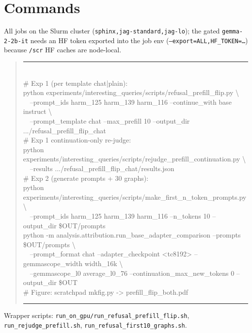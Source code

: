 \documentclass[11pt]{article}
\newenvironment{cbox}{\begin{quote}\small\begin{minipage}{0.95\linewidth}\rule{\linewidth}{0.4pt}\\}{\\\rule{\linewidth}{0.4pt}\end{minipage}\end{quote}}
\newcommand{\code}[1]{\texttt{\small #1}}
\begin{document}
\section{Commands}\label{app:commands}
All jobs on the Slurm cluster (\code{sphinx,jag-standard,jag-lo}); the gated \code{gemma-2-2b-it} needs an HF token exported into the job env (\code{--export=ALL,HF\_TOKEN=\ldots}) because \code{/scr} HF caches are node-local.
\begin{cbox}\scriptsize\ttfamily
\# Exp 1 (per template chat|plain):\\
python experiments/interesting\_queries/scripts/refusal\_prefill\_flip.py \textbackslash\\
\ \ --prompt\_ids harm\_125 harm\_139 harm\_116 --continue\_with base instruct \textbackslash\\
\ \ --prompt\_template chat --max\_prefill 10 --output\_dir .../refusal\_prefill\_flip\_chat\\[4pt]
\# Exp 1 continuation-only re-judge:\\
python experiments/interesting\_queries/scripts/rejudge\_prefill\_continuation.py \textbackslash\\
\ \ --results .../refusal\_prefill\_flip\_chat/results.json\\[4pt]
\# Exp 2 (generate prompts + 30 graphs):\\
python experiments/interesting\_queries/scripts/make\_first\_n\_token\_prompts.py \textbackslash\\
\ \ --prompt\_ids harm\_125 harm\_139 harm\_116 --n\_tokens 10 --output\_dir \$OUT/prompts\\
python -m analysis.attribution.run\_base\_adapter\_comparison --prompts \$OUT/prompts \textbackslash\\
\ \ --prompt\_format chat --adapter\_checkpoint <tc8192> --gemmascope\_width width\_16k \textbackslash\\
\ \ --gemmascope\_l0 average\_l0\_76 --continuation\_max\_new\_tokens 0 --output\_dir \$OUT\\[4pt]
\# Figure: scratchpad mkfig.py -> prefill\_flip\_both.pdf
\end{cbox}
Wrapper scripts: \code{run\_on\_gpu/run\_refusal\_prefill\_flip.sh}, \code{run\_rejudge\_prefill.sh}, \code{run\_refusal\_first10\_graphs.sh}.
\end{document}
